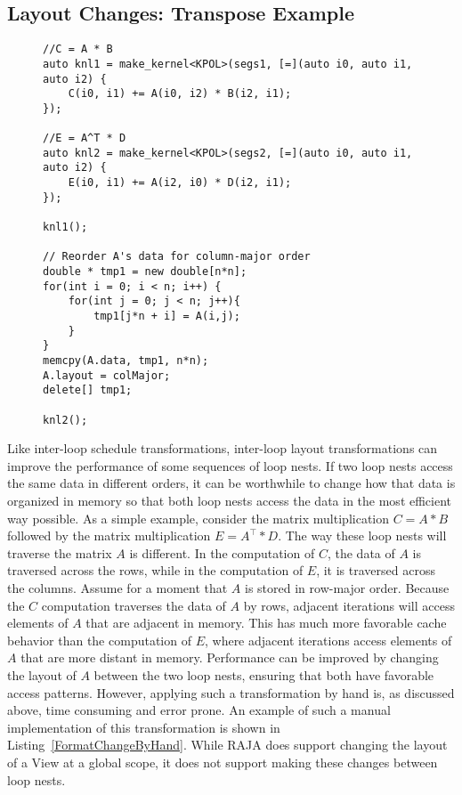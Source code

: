 \subsection{Layout Changes: Transpose Example}
\begin{figure}
\begin{lstlisting}[caption={Changing a View's data layout between computations by hand.},label={FormatChangeByHand}]
//C = A * B
auto knl1 = make_kernel<KPOL>(segs1, [=](auto i0, auto i1, auto i2) {
	C(i0, i1) += A(i0, i2) * B(i2, i1);
});

//E = A^T * D
auto knl2 = make_kernel<KPOL>(segs2, [=](auto i0, auto i1, auto i2) {
	E(i0, i1) += A(i2, i0) * D(i2, i1);
});

knl1();

// Reorder A's data for column-major order
double * tmp1 = new double[n*n];
for(int i = 0; i < n; i++) {
	for(int j = 0; j < n; j++){
		tmp1[j*n + i] = A(i,j);
	}
}
memcpy(A.data, tmp1, n*n);
A.layout = colMajor;
delete[] tmp1;

knl2();
\end{lstlisting}
\end{figure}
Like inter-loop schedule transformations, inter-loop layout transformations can improve the performance of some sequences of loop nests.
If two loop nests access the same data in different orders, it can be worthwhile to change how that data is organized in memory so that both loop nests access the data in the most efficient way possible.
As a simple example, consider the matrix multiplication $C = A * B$ followed by the matrix multiplication $E = A^{\top} * D$. 
The way these loop nests will traverse the matrix $A$ is different. 
In the computation of $C$, the data of $A$ is traversed across the rows, while in the computation of $E$, it is traversed across the columns.
Assume for a moment that $A$ is stored in row-major order.
Because the $C$ computation traverses the data of $A$ by rows, adjacent iterations will access elements of $A$ that are adjacent in memory.
This has much more favorable cache behavior than the computation of $E$, where adjacent iterations access elements of $A$ that are more distant in memory.
Performance can be improved by changing the layout of $A$ between the two loop nests, ensuring that both have favorable access patterns.
However, applying such a transformation by hand is, as discussed above, time consuming and error prone. 
An example of such a manual implementation of this transformation is shown in Listing~\ref{FormatChangeByHand}.
While RAJA does support changing the layout of a View at a global scope, it does not support making these changes between loop nests. 

